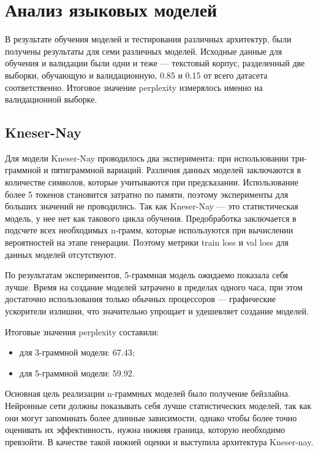 \section{Анализ языковых моделей}

В результате обучения моделей и тестирования различных архитектур, были получены результаты для семи различных моделей. Исходные данные для обучения и валидации были одни и теже --- текстовый корпус, разделенный две выборки, обучающую и валидационную, 0.85 и 0.15 от всего датасета соответственно. Итоговое значение perplexity измерялось именно на валидационной выборке.

\subsection{Kneser-Nay}

Для модели Kneser-Nay проводилось два эксперимента: при использовании три-граммной и пятиграммной вариаций. Различия данных моделей заключаются в количестве символов, которые учитываются при предсказании. Использование более 5 токенов становится затратно по памяти, поэтому эксперименты для больших значений не проводились. Так как Kneser-Nay --- это статистическая модель, у нее нет как такового цикла обучения. Предобработка заключается в подсчете всех необходимых n-грамм, которые используются при вычислении вероятностей на этапе генерации. Поэтому метрики train loss и val loss для данных моделей отсутствуют.

По результатам экспериментов, 5-граммная модель ожидаемо показала себя лучше. Время на создание моделей затрачено в пределах одного часа, при этом достаточно использования только обычных процессоров --- графические ускорители излишни, что значительно упрощает и удешевляет создание моделей.

Итоговые значения perplexity составили:

\begin{itemize}
	\item для 3-граммной модели: 67.43;
	\item для 5-граммной модели: 59.92.
\end{itemize}

Основная цель реализации n-граммных моделей было получение бейзлайна. Нейронные сети должны показывать себя лучше статистических моделей, так как они могут запоминать более длинные зависимости, однако чтобы более точно оценивать их эффективность, нужна нижняя граница, которую необходимо превзойти. В качестве такой нижней оценки и выступила архитектура Kneser-nay.

